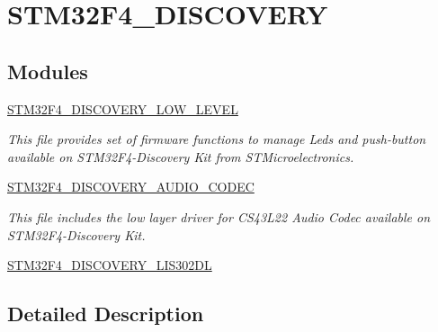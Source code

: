 \hypertarget{group___s_t_m32_f4___d_i_s_c_o_v_e_r_y}{\section{S\-T\-M32\-F4\-\_\-\-D\-I\-S\-C\-O\-V\-E\-R\-Y}
\label{group___s_t_m32_f4___d_i_s_c_o_v_e_r_y}
}
\subsection*{Modules}
\begin{DoxyCompactItemize}
\item 
\hyperlink{group___s_t_m32_f4___d_i_s_c_o_v_e_r_y___l_o_w___l_e_v_e_l}{S\-T\-M32\-F4\-\_\-\-D\-I\-S\-C\-O\-V\-E\-R\-Y\-\_\-\-L\-O\-W\-\_\-\-L\-E\-V\-E\-L}
\begin{DoxyCompactList}\small\item\em This file provides set of firmware functions to manage Leds and push-\/button available on S\-T\-M32\-F4-\/\-Discovery Kit from S\-T\-Microelectronics. \end{DoxyCompactList}\item 
\hyperlink{group___s_t_m32_f4___d_i_s_c_o_v_e_r_y___a_u_d_i_o___c_o_d_e_c}{S\-T\-M32\-F4\-\_\-\-D\-I\-S\-C\-O\-V\-E\-R\-Y\-\_\-\-A\-U\-D\-I\-O\-\_\-\-C\-O\-D\-E\-C}
\begin{DoxyCompactList}\small\item\em This file includes the low layer driver for C\-S43\-L22 Audio Codec available on S\-T\-M32\-F4-\/\-Discovery Kit. \end{DoxyCompactList}\item 
\hyperlink{group___s_t_m32_f4___d_i_s_c_o_v_e_r_y___l_i_s302_d_l}{S\-T\-M32\-F4\-\_\-\-D\-I\-S\-C\-O\-V\-E\-R\-Y\-\_\-\-L\-I\-S302\-D\-L}
\end{DoxyCompactItemize}


\subsection{Detailed Description}
